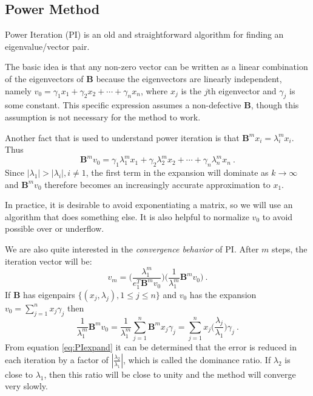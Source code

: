 \documentclass[12pt]{article}
\newcommand{\ve}[1]{\ensuremath{\mathbf{#1}}}
\begin{document}
\subsection*{Power Method}

Power Iteration (PI) is an old and straightforward algorithm for finding an eigenvalue/vector pair. 

The basic idea is that any non-zero vector can be written as a linear combination of the eigenvectors of $\ve{B}$ because the eigenvectors are linearly independent, namely $v_0 = \gamma_1 x_1 + \gamma_2 x_2 + \cdots + \gamma_n x_n$, where $x_{j}$ is the $j$th eigenvector and $\gamma_{j}$ is some constant. This specific expression assumes a non-defective $\ve{B}$, though this assumption is not necessary for the method to work. 

Another fact that is used to understand power iteration is that $\ve{B}^m x_i = \lambda_i^m x_i$. Thus
%
\begin{equation}
  \ve{B}^m v_{0} = \gamma_1 \lambda_1^m x_1 + \gamma_2 \lambda_2^m x_2 + \cdots + \gamma_n \lambda_n^m x_n \:.\nonumber
  \label{eq:Ak}
\end{equation}
%
Since $|\lambda_1| > |\lambda_i|, i \ne 1$, the first term in the expansion will dominate as $k \to \infty$ and $\ve{B}^m v_{0}$ therefore becomes an increasingly accurate approximation to $x_1$. 

In practice, it is desirable to avoid exponentiating a matrix, so we will use an algorithm that does something else. It is also helpful to normalize $v_0$ to avoid possible over or underflow.

We are also quite interested in the \textit{convergence behavior} of PI. After $m$ steps, the iteration vector will be: 
%
\begin{equation}
  v_{m} = \bigl( \frac{\lambda_{1}^{m}}{e_{1}^{T}\ve{B}^{m}v_{0}} \bigr) \bigl(\frac{1}{\lambda_{1}^{m}}\ve{B}^{m}v_{0} \bigr) \:. \nonumber
\end{equation}
% 
If $\ve{B}$ has eigenpairs $\{(x_{j}, \lambda_{j}), 1 \le j \le n \}$ and $v_{0}$ has the expansion $v_{0} = \sum_{j=1}^{n} x_{j}\gamma_{j}$ then
%
\begin{equation}
  \frac{1}{\lambda_{1}^{m}}\ve{B}^{m}v_{0} =  \frac{1}{\lambda_{1}^{m}} \sum_{j=1}^{n} \ve{B}^{m}x_{j}\gamma_{j} = \sum_{j=1}^{n} x_{j} \bigl(\frac{\lambda_{j}}{\lambda_{1}} \bigr) \gamma_{j} \:.
  \label{eq:PIexpand}
\end{equation}
%
From equation \eqref{eq:PIexpand} it can be determined that the error is reduced in each iteration by a factor of $|\frac{\lambda_{2}}{\lambda_{1}}|$, which is called the dominance ratio. If $\lambda_2$ is close to $\lambda_1$, then this ratio will be close to unity and the method will converge very slowly. 
\end{document}
